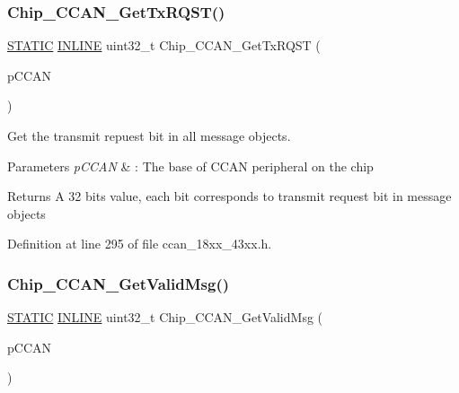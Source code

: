 \subsubsection{\texorpdfstring{Chip\+\_\+\+C\+C\+A\+N\+\_\+\+Get\+Tx\+R\+Q\+S\+T()}{Chip\_CCAN\_GetTxRQST()}}
{\footnotesize\ttfamily \hyperlink{group___l_p_c___types___public___macros_ga10b2d890d871e1489bb02b7e70d9bdfb}{S\+T\+A\+T\+IC} \hyperlink{spifi__18xx__43xx_8h_a2eb6f9e0395b47b8d5e3eeae4fe0c116}{I\+N\+L\+I\+NE} uint32\+\_\+t Chip\+\_\+\+C\+C\+A\+N\+\_\+\+Get\+Tx\+R\+Q\+ST (\begin{DoxyParamCaption}\item[{\hyperlink{struct_l_p_c___c_c_a_n___t}{L\+P\+C\+\_\+\+C\+C\+A\+N\+\_\+T} $\ast$}]{p\+C\+C\+AN }\end{DoxyParamCaption})}



Get the transmit repuest bit in all message objects. 


\begin{DoxyParams}{Parameters}
{\em p\+C\+C\+AN} & \+: The base of C\+C\+AN peripheral on the chip \\
\hline
\end{DoxyParams}
\begin{DoxyReturn}{Returns}
A 32 bits value, each bit corresponds to transmit request bit in message objects 
\end{DoxyReturn}


Definition at line 295 of file ccan\+\_\+18xx\+\_\+43xx.\+h.

\mbox{\label{group___c_c_a_n__18_x_x__43_x_x_gaf3e7cad0a5b86b9857d20f24531f779a}} 
\subsubsection{\texorpdfstring{Chip\+\_\+\+C\+C\+A\+N\+\_\+\+Get\+Valid\+Msg()}{Chip\_CCAN\_GetValidMsg()}}
{\footnotesize\ttfamily \hyperlink{group___l_p_c___types___public___macros_ga10b2d890d871e1489bb02b7e70d9bdfb}{S\+T\+A\+T\+IC} \hyperlink{spifi__18xx__43xx_8h_a2eb6f9e0395b47b8d5e3eeae4fe0c116}{I\+N\+L\+I\+NE} uint32\+\_\+t Chip\+\_\+\+C\+C\+A\+N\+\_\+\+Get\+Valid\+Msg (\begin{DoxyParamCaption}\item[{\hyperlink{struct_l_p_c___c_c_a_n___t}{L\+P\+C\+\_\+\+C\+C\+A\+N\+\_\+T} $\ast$}]{p\+C\+C\+AN }\end{DoxyParamCaption})}



